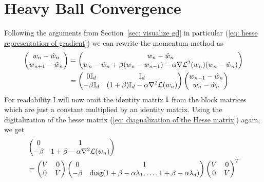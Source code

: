 \section{Heavy Ball Convergence}\label{sec: heavy ball convergence}

Following the arguments from Section~\ref{sec: visualize gd} in particular
(\ref{eq: hesse representation of gradient}) we can rewrite the momentum
method as
\begin{align*}
	\begin{pmatrix}
		w_n - \hat{w}_n \\
		w_{n+1} - \hat{w}_n
	\end{pmatrix}
	&=
	\begin{pmatrix}
		w_n - \hat{w}_n \\
		w_n - \hat{w}_n + \beta (w_n - w_{n-1})
		- \alpha \nabla\mathcal{L}^2(w_n)(w_n -\hat{w}_n)
	\end{pmatrix}\\
	&=
	\begin{pmatrix}
		0\mathbb{I}_d & \mathbb{I}_d \\
		-\beta\mathbb{I}_d
		& (1+\beta)\mathbb{I}_d -\alpha \nabla^2\mathcal{L}(w_n)
	\end{pmatrix}
	\begin{pmatrix}
		w_{n-1} - \hat{w}_n \\
		w_n - \hat{w}_n
	\end{pmatrix}
\end{align*}
%
For readability I will now omit the identity matrix \(\mathbb{I}\) from the
block matrices which are just a constant multiplied by an identity matrix.
Using the digitalization of the hesse matrix (\ref{eq: diagnalization of the
Hesse matrix}) again, we get
%
\begin{align*}
	&\begin{pmatrix}
		0 & 1 \\
		-\beta & 1+\beta -\alpha \nabla^2\mathcal{L}(w_n)
	\end{pmatrix}\\
	&=
	\begin{pmatrix}
		V & 0 \\
		0 & V
	\end{pmatrix}	
	\begin{pmatrix}
		0 & 1 \\
		-\beta &
		\text{diag}(1+\beta -\alpha\lambda_1, \dots, 
		1+\beta -\alpha\lambda_d)
	\end{pmatrix}
	\begin{pmatrix}
		V & 0 \\
		0 & V
	\end{pmatrix}^T
\end{align*}
